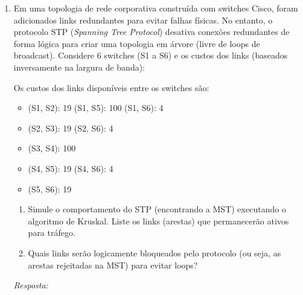 \documentclass[12pt]{article}
\newcommand{\quadro}[1]{\vspace{0.2cm}\begin{tcolorbox}[colback=white, colframe=black, height=#1, boxrule=0.5pt, arc=0pt] \textit{Resposta:} \end{tcolorbox}}
\begin{document}
\begin{enumerate}[label=\arabic*), leftmargin=1.5cm, itemsep=0.8cm]
\item Em uma topologia de rede corporativa construída com switches Cisco, foram adicionados links redundantes para evitar falhas físicas. No entanto, o protocolo STP (\textit{Spanning Tree Protocol}) desativa conexões redundantes de forma lógica para criar uma topologia em árvore (livre de loops de broadcast). Considere 6 switches (S1 a S6) e os custos dos links (baseados inversamente na largura de banda):
\begin{center}
\end{center}

Os custos dos links disponíveis entre os switches são:
\begin{itemize}
    \item (S1, S2): 19 \qquad (S1, S5): 100 \qquad (S1, S6): 4
    \item (S2, S3): 19 \qquad (S2, S6): 4
    \item (S3, S4): 100
    \item (S4, S5): 19 \qquad (S4, S6): 4
    \item (S5, S6): 19
\end{itemize}
\begin{enumerate}[label=\alph*)]
    \item Simule o comportamento do STP (encontrando a MST) executando o algoritmo de Kruskal. Liste os links (arestas) que permanecerão ativos para tráfego.
    \item Quais links serão logicamente bloqueados pelo protocolo (ou seja, as arestas rejeitadas na MST) para evitar loops?
\end{enumerate}
\quadro{7cm}


\end{enumerate}
\end{document}

